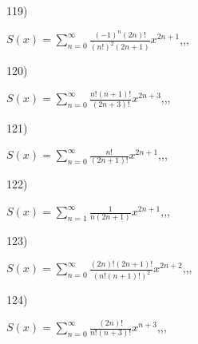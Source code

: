 \documentclass[11pt, ukrainian]{article}
\begin{document}
\par
\vspace{0.9cm}
119) \space 
{%
{$S(x)=\sum\limits_{n=0}^{\infty}{\frac{{(-1)^n}(2n)!}{(n!)^2(2n+1)}}{x^{{2n+1}}}$},,, \par \smallskip  
}
\par
\vspace{0.9cm}
120) \space 
{%
{$S(x)=\sum\limits_{n=0}^{\infty}{\frac{n!(n+1)!}{(2n+3)!}}{x^{{2n+3}}}$},,, \par \smallskip  
}
\par
\newpage
121) \space 
{%
{$S(x)=\sum\limits_{n=0}^{\infty}{\frac{n!}{(2n+1)!}}{x^{{2n+1}}}$},,, \par \smallskip  
}
\par
\vspace{0.9cm}
122) \space 
{%
{$S(x)=\sum\limits_{n=1}^{\infty}{\frac{1}{n(2n+1)}}{x^{{2n+1}}}$},,, \par \smallskip  
}
\par
\vspace{0.9cm}
123) \space 
{%
{$S(x)=\sum\limits_{n=0}^{\infty}{\frac{(2n)!(2n+1)!}{(n!(n+1)!)^2}}{x^{{2n+2}}}$},,, \par \smallskip  
}
\par
\vspace{0.9cm}
124) \space 
{%
{$S(x)=\sum\limits_{n=0}^{\infty}{\frac{(2n)!}{n!(n+3)!}}{x^{{n+3}}}$},,, \par \smallskip  
}
\end{document}
